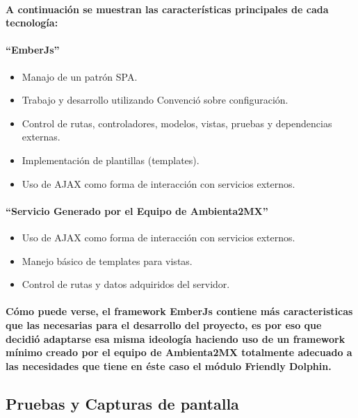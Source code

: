     \paragraph{A continuación se muestran las características principales de cada tecnología:}
    \paragraph{``EmberJs''}    
    \begin{itemize}
      \item Manajo de un patrón SPA.
      \item Trabajo y desarrollo utilizando Convenció sobre configuración.
      \item Control de rutas, controladores, modelos, vistas, pruebas y dependencias externas.
      \item Implementación de plantillas (templates).
      \item Uso de AJAX como forma de interacción con servicios externos.
    \end{itemize}
    \paragraph{``Servicio Generado por el Equipo de Ambienta2MX''}    
    \begin{itemize}
      \item Uso de AJAX como forma de interacción con servicios externos.
      \item Manejo básico de templates para vistas.
      \item Control de rutas y datos adquiridos del servidor.
    \end{itemize}
    \paragraph{Cómo puede verse, el framework EmberJs contiene más caracteristicas que las necesarias para el desarrollo del proyecto, es por eso que decidió adaptarse esa misma ideología haciendo uso de  un framework mínimo creado por el equipo de Ambienta2MX totalmente adecuado a las necesidades que tiene en éste caso el módulo Friendly Dolphin.}
  \subsection{Pruebas y Capturas de pantalla}
